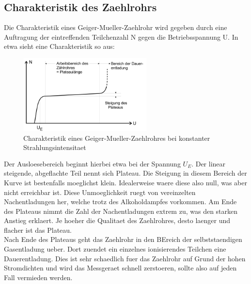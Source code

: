 \documentclass[titlepage=firstcover, captions=tableheading]{scrartcl}
\begin{document}
\subsection{Charakteristik des Zaehlrohrs}
Die Charakteristik eines Geiger-Mueller-Zaehlrohr wird gegeben durch eine Auftragung der eintreffenden Teilchenzahl N gegen die Betriebsspannung U. In etwa sieht eine Charakteristik so aus:
\begin{figure}[H]
    \centering
    \includegraphics[width=0.6\textwidth]{"Charakteristik_Geiger.png"}
    \caption{Charakteristik eines Geiger-Mueller-Zaehlrohres bei konstanter Strahlungsintensitaet}
    \label{Fig:Charakteristik}
\end{figure}
\noindent Der Ausloesebereich beginnt hierbei etwa bei der Spannung $U_E$. Der linear steigende, abgeflachte Teil nennt sich Plateau. Die Steigung in diesem Bereich der Kurve ist bestenfalls moeglichst klein. Idealerweise waere diese also null, was aber nicht erreichbar ist. Diese Unmoeglichkeit ruegt von vereinzelten Nachentladungen her, welche trotz des Alkoholdampfes vorkommen. Am Ende des Plateaus nimmt die Zahl der Nachentladungen extrem zu, was den starken Anstieg erklaert. Je hoeher die Qualitaet des Zaehlrohres, desto laenger und flacher ist das Plateau.\\
Nach Ende des Plateaus geht das Zaehlrohr in den BEreich der selbststaendigen Gasentladung ueber. Dort zuendet ein einzelnes ionisierendes Teilchen eine Dauerentladung. Dies ist sehr schaedlich fuer das Zaehlrohr auf Grund der hohen Stromdichten und wird das Messgeraet schnell zerstoeren, sollte also auf jeden Fall vermieden werden.
\end{document}
